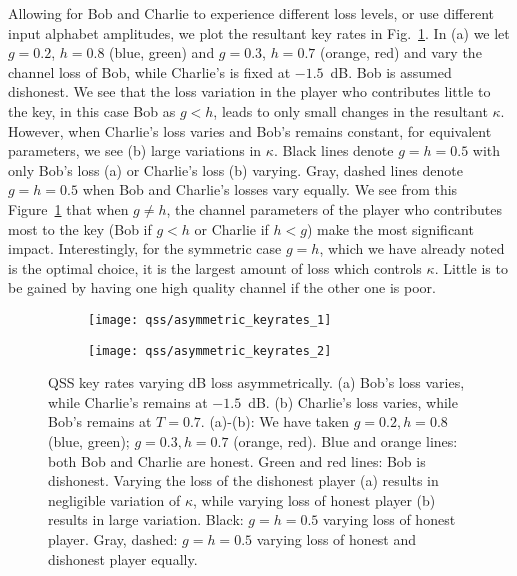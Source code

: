 Allowing for Bob and Charlie to experience different loss levels, or use different input alphabet amplitudes, we plot the resultant key rates in Fig.~\ref{fig:qss_keyrate_asymmetric}. In (a) we let $g=0.2$, $h=0.8$ (blue, green) and $g=0.3$, $h=0.7$ (orange, red) and vary the channel loss of Bob, while Charlie's is fixed at $-1.5$~dB. Bob is assumed dishonest. We see that the loss variation in the player who contributes little to the key, in this case Bob as $g < h$, leads to only small changes in the resultant $\kappa$. However, when Charlie's loss varies and Bob's remains constant, for equivalent parameters, we see (b) large variations in $\kappa$. Black lines denote $g=h=0.5$ with only Bob's loss (a) or Charlie's loss (b) varying. Gray, dashed lines denote $g=h=0.5$ when Bob and Charlie's losses vary equally. We see from this Figure~\ref{fig:qss_keyrate_asymmetric} that when $g \ne h$, the channel parameters of the player who contributes most to the key (Bob if $g < h$ or Charlie if $h < g$) make the most significant impact. Interestingly, for the symmetric case $g=h$, which we have already noted is the optimal choice, it is the largest amount of loss which controls $\kappa$. Little is to be gained by having one high quality channel if the other one is poor. 


\begin{figure}[htp]
\captionsetup{width=0.8\linewidth}
\centering
	\begin{subfigure}{0.7\linewidth}
	\centering
	\texttt{[image: qss/asymmetric\_keyrates\_1]}
	\caption{}
	\end{subfigure}
	\begin{subfigure}{0.7\linewidth}
	\centering
	\texttt{[image: qss/asymmetric\_keyrates\_2]}
	\caption{}
	\end{subfigure}
\caption{\label{fig:qss_keyrate_asymmetric} QSS key rates varying dB loss asymmetrically. (a) Bob's loss varies, while Charlie's remains at $-1.5$~dB. (b) Charlie's loss varies, while Bob's remains at $T=0.7$. (a)-(b): We have taken $g = 0.2, h=0.8$ (blue, green); $g=0.3, h=0.7$ (orange, red). Blue and orange lines: both Bob and Charlie are honest. Green and red lines: Bob is dishonest. Varying the loss of the dishonest player (a) results in negligible variation of $\kappa$, while varying loss of honest player (b) results in large variation. Black: $g=h=0.5$ varying loss of honest player. Gray, dashed: $g=h=0.5$ varying loss of honest and dishonest player equally.}
\end{figure}





